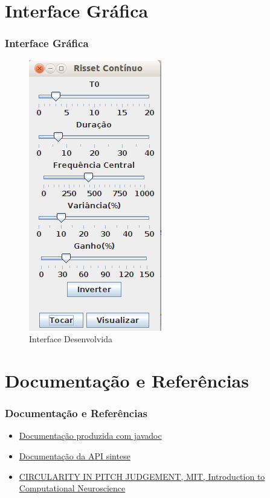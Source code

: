 \documentclass{beamer}
\begin{document}
\section{Interface Gráfica}
\begin{frame}
 \frametitle{Interface Gráfica}
 \begin{figure}
  \includegraphics[scale=0.4]{./images/gui.png}
  \caption{Interface Desenvolvida}
   \end{figure}
\end{frame}
\section{Documentação e Referências}
\begin{frame}
  \frametitle{Documentação e Referências}
  \begin{itemize}
  \item \href{../doc/index.html}{Documentação produzida com javadoc}
  \item \href{http://www.cic.unb.br/docentes/lcmm/sintese/javadoc/}{Documentação da API sintese}
  \item \href{http://hebb.mit.edu/courses/9.29/2003/athena/auditory/risset.html}{CIRCULARITY IN PITCH JUDGEMENT, MIT, Introduction to Computational Neuroscience}
  \end{itemize}
\end{frame}
\end{document}
